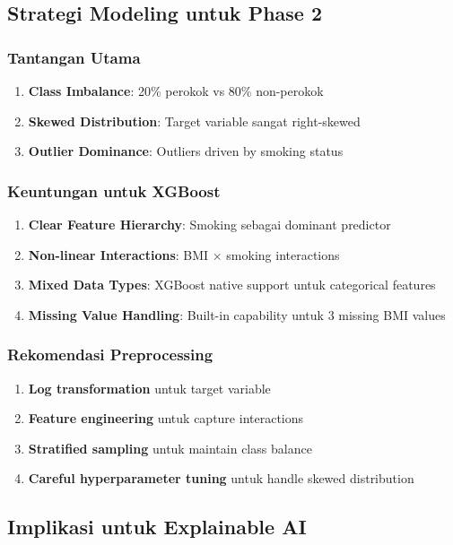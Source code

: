 \subsection{Strategi Modeling untuk Phase 2}
\label{subsec:strategi-modeling}

\subsubsection{Tantangan Utama}
\begin{enumerate}
    \item \textbf{Class Imbalance}: 20\% perokok vs 80\% non-perokok
    \item \textbf{Skewed Distribution}: Target variable sangat right-skewed
    \item \textbf{Outlier Dominance}: Outliers driven by smoking status
\end{enumerate}

\subsubsection{Keuntungan untuk XGBoost}
\begin{enumerate}
    \item \textbf{Clear Feature Hierarchy}: Smoking sebagai dominant predictor
    \item \textbf{Non-linear Interactions}: BMI × smoking interactions
    \item \textbf{Mixed Data Types}: XGBoost native support untuk categorical features
    \item \textbf{Missing Value Handling}: Built-in capability untuk 3 missing BMI values
\end{enumerate}

\subsubsection{Rekomendasi Preprocessing}
\begin{enumerate}
    \item \textbf{Log transformation} untuk target variable
    \item \textbf{Feature engineering} untuk capture interactions
    \item \textbf{Stratified sampling} untuk maintain class balance
    \item \textbf{Careful hyperparameter tuning} untuk handle skewed distribution
\end{enumerate}

\subsection{Implikasi untuk Explainable AI}
\label{subsec:implikasi-xai}

